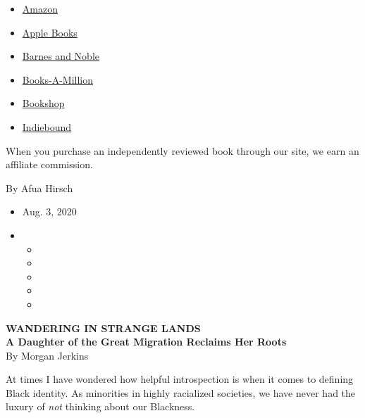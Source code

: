 \begin{itemize}
\tightlist
\item
  \href{https://www.amazon.com/gp/search?index=books\&tag=NYTBSREV-20\&field-keywords=Wandering+in+Strange+Lands\%3A+A+Daughter+of+the+Great+Migration+Reclaims+Her+Roots+Morgan+Jerkins}{Amazon}
\item
  \href{https://du-gae-books-dot-nyt-du-prd.appspot.com/buy?title=Wandering+in+Strange+Lands\%3A+A+Daughter+of+the+Great+Migration+Reclaims+Her+Roots\&author=Morgan+Jerkins}{Apple
  Books}
\item
  \href{https://www.anrdoezrs.net/click-7990613-11819508?url=https\%3A\%2F\%2Fwww.barnesandnoble.com\%2Fw\%2F\%3Fean\%3D9780062873040}{Barnes
  and Noble}
\item
  \href{https://www.anrdoezrs.net/click-7990613-35140?url=https\%3A\%2F\%2Fwww.booksamillion.com\%2Fp\%2FWandering\%2Bin\%2BStrange\%2BLands\%253A\%2BA\%2BDaughter\%2Bof\%2Bthe\%2BGreat\%2BMigration\%2BReclaims\%2BHer\%2BRoots\%2FMorgan\%2BJerkins\%2F9780062873040}{Books-A-Million}
\item
  \href{https://bookshop.org/a/3546/9780062873040}{Bookshop}
\item
  \href{https://www.indiebound.org/book/9780062873040?aff=NYT}{Indiebound}
\end{itemize}

When you purchase an independently reviewed book through our site, we
earn an affiliate commission.

By Afua Hirsch

\begin{itemize}
\item
  Aug. 3, 2020
\item
  \begin{itemize}
  \item
  \item
  \item
  \item
  \item
  \end{itemize}
\end{itemize}

\textbf{WANDERING IN STRANGE LANDS}\\
\textbf{A Daughter of the Great Migration Reclaims Her Roots}\\
By Morgan Jerkins

At times I have wondered how helpful introspection is when it comes to
defining Black identity. As minorities in highly racialized societies,
we have never had the luxury of \emph{not} thinking about our Blackness.

